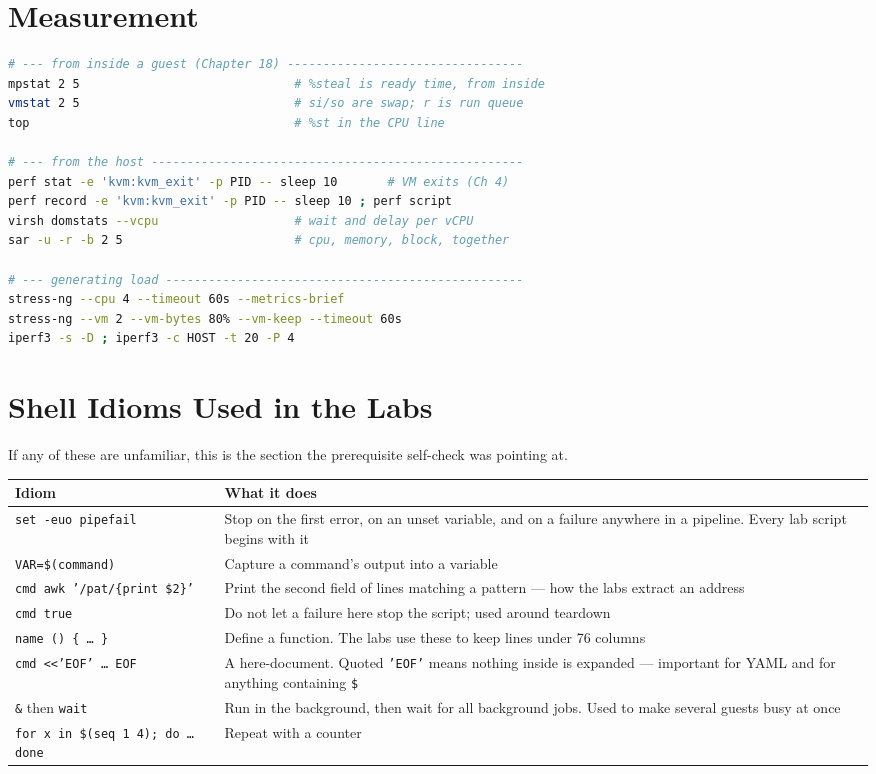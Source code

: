 \section{Measurement}

\begin{lstlisting}[language=bash]
# --- from inside a guest (Chapter 18) ---------------------------------
mpstat 2 5                              # %steal is ready time, from inside
vmstat 2 5                              # si/so are swap; r is run queue
top                                     # %st in the CPU line

# --- from the host ----------------------------------------------------
perf stat -e 'kvm:kvm_exit' -p PID -- sleep 10       # VM exits (Ch 4)
perf record -e 'kvm:kvm_exit' -p PID -- sleep 10 ; perf script
virsh domstats --vcpu                   # wait and delay per vCPU
sar -u -r -b 2 5                        # cpu, memory, block, together

# --- generating load --------------------------------------------------
stress-ng --cpu 4 --timeout 60s --metrics-brief
stress-ng --vm 2 --vm-bytes 80% --vm-keep --timeout 60s
iperf3 -s -D ; iperf3 -c HOST -t 20 -P 4
\end{lstlisting}

\section{Shell Idioms Used in the Labs}

If any of these are unfamiliar, this is the section the prerequisite self-check
was pointing at.

\begin{longtable}{@{}L{5.4cm}L{9.6cm}@{}}
\toprule
{}
\textbf{Idiom} & \textbf{What it does} \\
\midrule
\endhead
\texttt{set -euo pipefail} & Stop on the first error, on an unset variable, and
on a failure anywhere in a pipeline. Every lab script begins with it \\
\texttt{VAR=\$(command)} & Capture a command's output into a variable \\
\texttt{cmd \textbar{} awk '/pat/\{print \$2\}'} & Print the second field of
lines matching a pattern --- how the labs extract an address \\
\texttt{cmd \textbar{}\textbar{} true} & Do not let a failure here stop the
script; used around teardown \\
\texttt{name () \{ \ldots{} \}} & Define a function. The labs use these to keep
lines under 76 columns \\
\texttt{cmd <<'EOF' \ldots{} EOF} & A here-document. Quoted \texttt{'EOF'} means
nothing inside is expanded --- important for YAML and for anything containing
\texttt{\$} \\
\texttt{\&} then \texttt{wait} & Run in the background, then wait for all
background jobs. Used to make several guests busy at once \\
\texttt{for x in \$(seq 1 4); do \ldots{} done} & Repeat with a counter \\
\bottomrule
\end{longtable}

